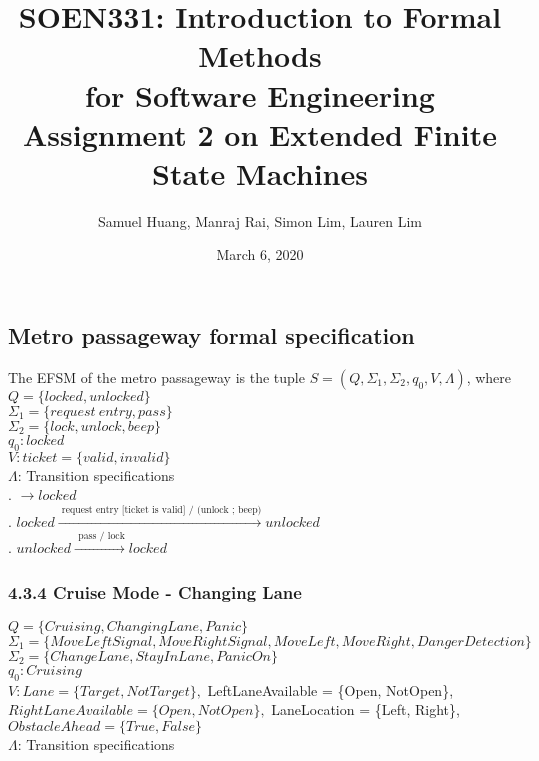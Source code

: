 \documentclass[12pt]{article}
\title{SOEN331: Introduction to Formal Methods\\for Software Engineering\\
Assignment 2 on Extended Finite State Machines}
\author{Samuel Huang, Manraj Rai, Simon Lim, Lauren Lim}
\date{March 6, 2020}
\begin{document}
\begin{spacing}{1.5}

\maketitle

\section{Metro passageway formal specification}

\noindent The EFSM of the metro passageway is the tuple $S = (Q, \Sigma_1, \Sigma_2, q_0, V, \Lambda)$, where\\

\noindent $Q = \{locked, unlocked\}$\\
\noindent $\Sigma_1 = \{request~entry, pass\}$\\
\noindent $\Sigma_2 = \{lock, unlock, beep\}$\\
\noindent $q_0: locked$\\
\noindent $V: ticket = \{valid, invalid\}$\\
\noindent $\Lambda$: Transition specifications\\
. $\rightarrow locked$\\
. $locked \xrightarrow {\text { request entry [ticket is valid] / (unlock ; beep)}} unlocked$\\
. $unlocked \xrightarrow {\text { pass / lock}} locked$\\


\subsubsection{4.3.4 Cruise Mode - Changing Lane}

\noindent $Q = \{Cruising, ChangingLane, Panic\}$\\
\noindent $\Sigma_1 = \{MoveLeftSignal, MoveRightSignal, MoveLeft, MoveRight, DangerDetection\}$\\
\noindent $\Sigma_2 = \{ChangeLane, StayInLane, PanicOn\}$\\
\noindent $q_0: Cruising$\\
\noindent $V: Lane = \{Target, NotTarget\}, $ LeftLaneAvailable  = \{Open, NotOpen\}, $ RightLaneAvailable  = \{Open, NotOpen\}, $ LaneLocation  = \{Left, Right\}, $ ObstacleAhead  = \{True, False\}$\\
\noindent $\Lambda$: Transition specifications\\


\end{spacing}
\end{document}
